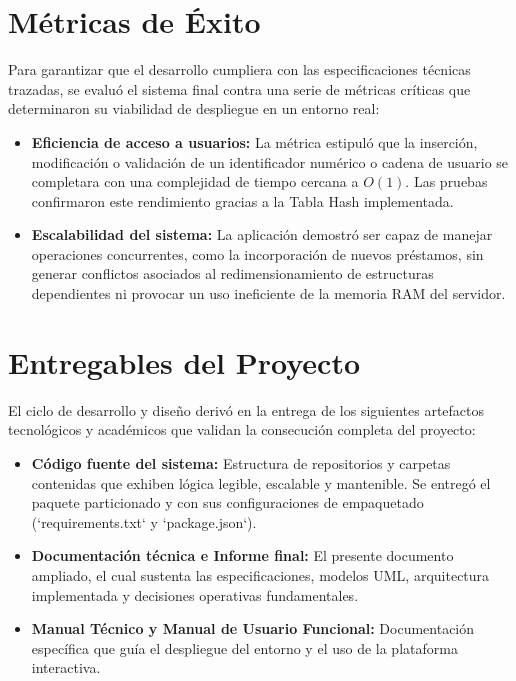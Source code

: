 \documentclass{rapport}
\begin{document}
\section{Métricas de Éxito}

Para garantizar que el desarrollo cumpliera con las especificaciones técnicas trazadas, se evaluó el sistema final contra una serie de métricas críticas que determinaron su viabilidad de despliegue en un entorno real:

\begin{itemize}
    \item \textbf{Eficiencia de acceso a usuarios:}  La métrica estipuló que la inserción, modificación o validación de un identificador numérico o cadena de usuario se completara con una complejidad de tiempo cercana a $O(1)$. Las pruebas confirmaron este rendimiento gracias a la Tabla Hash implementada.
    \item \textbf{Escalabilidad del sistema:} La aplicación demostró ser capaz de manejar operaciones concurrentes, como la incorporación de nuevos préstamos, sin generar conflictos asociados al redimensionamiento de estructuras dependientes ni provocar un uso ineficiente de la memoria RAM del servidor.
\end{itemize}

\section{Entregables del Proyecto}

El ciclo de desarrollo y diseño derivó en la entrega de los siguientes artefactos tecnológicos y académicos que validan la consecución completa del proyecto:

\begin{itemize}
    \item \textbf{Código fuente del sistema:} Estructura de repositorios y carpetas contenidas que exhiben lógica legible, escalable y mantenible. Se entregó el paquete particionado y con sus configuraciones de empaquetado (`requirements.txt` y `package.json`).
    \item \textbf{Documentación técnica e Informe final:} El presente documento ampliado, el cual sustenta las especificaciones, modelos UML, arquitectura implementada y decisiones operativas fundamentales.
    \item \textbf{Manual Técnico y Manual de Usuario Funcional:} Documentación específica que guía el despliegue del entorno y el uso de la plataforma interactiva.
\end{itemize}
\end{document}
